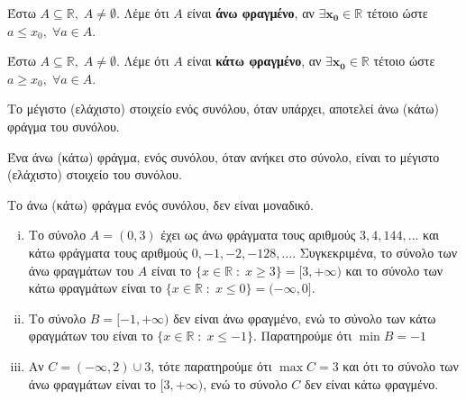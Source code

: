 \begin{mybox1}
\begin{dfn}
  Έστω $ A \subseteq \mathbb{R}, \; A \neq \emptyset $. Λέμε ότι 
  $A$ είναι \textbf{άνω φραγμένο}, αν $ \bm{\exists x_{0} \in \mathbb{R}}$ τέτοιο ώστε 
  $ a \leq x_{0}, \; \forall a \in A$.
\end{dfn}
\end{mybox1}

\begin{mybox1}
\begin{dfn}
  Έστω $ A \subseteq \mathbb{R}, \; A \neq \emptyset $. Λέμε ότι 
  $A$ είναι \textbf{κάτω φραγμένο}, αν $ \bm{\exists x_{0} \in \mathbb{R}}$ τέτοιο ώστε 
  $ a \geq x_{0}, \; \forall a \in A $.
\end{dfn}
\end{mybox1}

\begin{rems}
\item {}
  \begin{myitemize}
    \item Το μέγιστο (ελάχιστο) στοιχείο ενός συνόλου, όταν υπάρχει, αποτελεί άνω
      (κάτω) φράγμα του συνόλου.
    \item Ένα  άνω (κάτω) φράγμα, ενός συνόλου, όταν ανήκει στο σύνολο, είναι 
      το μέγιστο (ελάχιστο) στοιχείο του συνόλου.
    \item Το άνω (κάτω) φράγμα ενός συνόλου, δεν είναι μοναδικό.
  \end{myitemize}
\end{rems}

\begin{example}
\item {}
  \begin{enumerate}[(i)]
    \item Το  σύνολο $ A = (0,3) $  έχει ως άνω φράγματα τους αριθμούς 
      $ 3, 4, 144, \ldots$ και κάτω φράγματα τους αριθμούς
      $ 0, -1, -2, -128, \ldots $. Συγκεκριμένα, το σύνολο των άνω φραγμάτων του 
      $A$ είναι το $ \{ x \in \mathbb{R} \; : \; x \geq 3 \} = [3,+\infty) $ και 
      το σύνολο των κάτω φραγμάτων είναι το 
      $ \{ x \in \mathbb{R} \; : \; x \leq 0 \} = (-\infty,0] $.

    \item Το σύνολο $ B = [-1,+\infty) $ δεν είναι άνω φραγμένο, ενώ το σύνολο των 
      κάτω φραγμάτων του είναι το $ \{ x \in \mathbb{R} \; : \; x \leq -1 \} $. 
      Παρατηρούμε ότι $ \min B =-1 $ 

    \item Αν $ C= (-\infty,2) \cup {3} $, τότε παρατηρούμε ότι $ \max C = 3 $ και ότι 
      το σύνολο των άνω φραγμάτων είναι το $[3,+\infty) $, ενώ το σύνολο $C$ δεν είναι 
      κάτω φραγμένο.
  \end{enumerate}
\end{example}

